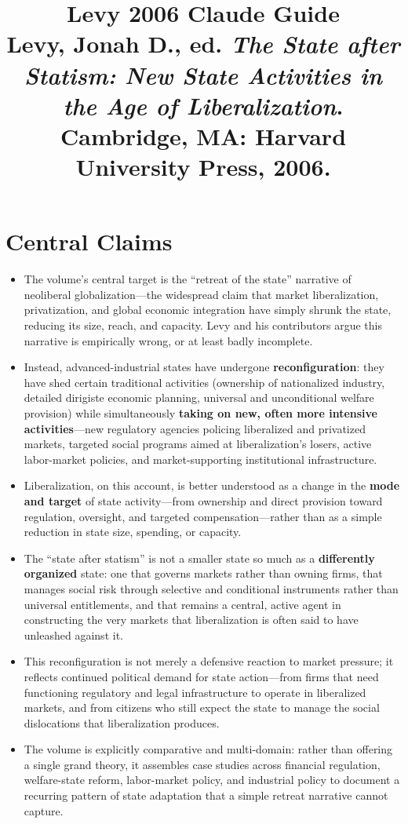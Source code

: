 \documentclass[12pt]{article}
\title{\textbf{Levy 2006 Claude Guide}\\
\large Levy, Jonah D., ed. \textit{The State after Statism: New State Activities in the Age of Liberalization}.\\
Cambridge, MA: Harvard University Press, 2006.}
\author{}
\date{}
\begin{document}
\maketitle
\tableofcontents
\newpage

\section{Central Claims}

\begin{itemize}[leftmargin=*, itemsep=4pt]
    \item The volume's central target is the ``retreat of the state'' narrative of neoliberal globalization---the widespread claim that market liberalization, privatization, and global economic integration have simply shrunk the state, reducing its size, reach, and capacity. Levy and his contributors argue this narrative is empirically wrong, or at least badly incomplete.
    \item Instead, advanced-industrial states have undergone \textbf{reconfiguration}: they have shed certain traditional activities (ownership of nationalized industry, detailed dirigiste economic planning, universal and unconditional welfare provision) while simultaneously \textbf{taking on new, often more intensive activities}---new regulatory agencies policing liberalized and privatized markets, targeted social programs aimed at liberalization's losers, active labor-market policies, and market-supporting institutional infrastructure.
    \item Liberalization, on this account, is better understood as a change in the \textbf{mode and target} of state activity---from ownership and direct provision toward regulation, oversight, and targeted compensation---rather than as a simple reduction in state size, spending, or capacity.
    \item The ``state after statism'' is not a smaller state so much as a \textbf{differently organized} state: one that governs markets rather than owning firms, that manages social risk through selective and conditional instruments rather than universal entitlements, and that remains a central, active agent in constructing the very markets that liberalization is often said to have unleashed against it.
    \item This reconfiguration is not merely a defensive reaction to market pressure; it reflects continued political demand for state action---from firms that need functioning regulatory and legal infrastructure to operate in liberalized markets, and from citizens who still expect the state to manage the social dislocations that liberalization produces.
    \item The volume is explicitly comparative and multi-domain: rather than offering a single grand theory, it assembles case studies across financial regulation, welfare-state reform, labor-market policy, and industrial policy to document a recurring pattern of state adaptation that a simple retreat narrative cannot capture.
\end{itemize}
\end{document}
